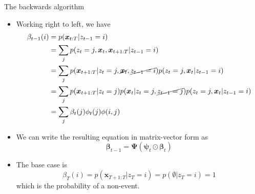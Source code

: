 \documentclass[10pt,mathserif]{beamer}
\begin{document}
\begin{frame}{The backwards algorithm}
\begin{itemize}
    \item Working right to left, we have
    \begin{equation*}
        \begin{split}
            \beta_{t-1}(i) & = p(\bm{x}_{t:T}|z_{t-1}=i)\\
            & = \sum_j p(z_t =j,\bm{x}_t,\bm{x}_{t+1:T}|z_{t-1} =i)\\
            & = \sum_j p(\bm{x}_{t+1:T} |z_t =j,\cancel{\bm{x}_t},\cancel{z_{t-1} =i})p(z_t =j,\bm{x}_t |z_{t-1} =i)\\
            & = \sum_j p(\bm{x}_{t+1:T} |z_t =j) p(\bm{x}_t|z_t=j,\cancel{z_{t-1}=j})p(z_t =j,\bm{x}_t |z_{t-1} =i)\\
            &  = \sum_j\beta_t(j)\phi_t(j)\phi(i,j)
        \end{split}
    \end{equation*}
    
    \item We can write the resulting equation in matrix-vector form as
    \begin{equation*}
        \bm{\beta}_{t-1} = \bm{\Psi}(\bm{\psi}_t \odot \bm{\beta}_t)
    \end{equation*}
    
    \item The base case is
    \begin{equation*}
        \beta_T(i) = p(\bm{x}_{T+1:T}|z_T = i) = p(\emptyset|z_T = i) = 1
    \end{equation*}
    which is the probability of a non-event.
\end{itemize}
\end{frame}
\end{document}
